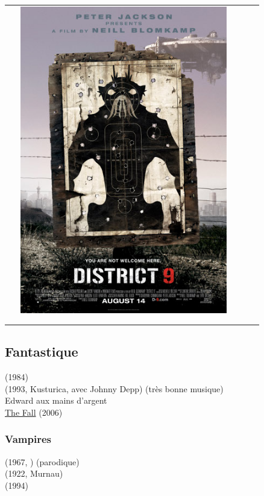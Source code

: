 \begin{tabular}{c c c}
\begin{minipage}{5cm}
\includegraphics[width=0.9\textwidth]{affiches/D9.jpg} 
\end{minipage} \\ \\ \\
\end{tabular}

\subsection{Fantastique}
 (1984)\\
 (1993, Kusturica, avec Johnny Depp) (très bonne musique)\\
Edward aux mains d'argent\\
\href{http://www.imdb.com/title/tt0460791}{The Fall} (2006)

\subsubsection*{Vampires}
 (1967, \RomanPolanski) (parodique) \beau \\
 (1922, Murnau)\\
 (1994)\\

